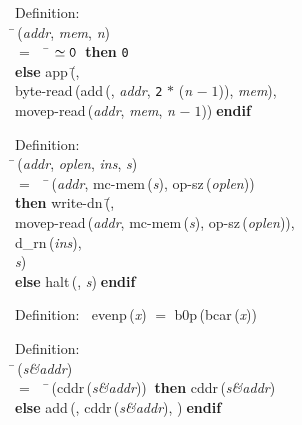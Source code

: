 \begin{tabbing}{\sc Definition}: \\  
\=\,({\it{addr\/}}, {\it{mem\/}}, {\it{n\/}}) \\ 
$=$$\;\;\;\;$\= $\simeq {\tt{0}}$$\;\;${\bf then }{\tt{0}} \\ 
{\bf else }{\rm{app}}\,(\=, \\ 
{\rm{byte-read}}\,({\rm{add}}\,({}, {\it{addr\/}}, {\tt{2}} $*$ ({\it{n\/}} $-\;1$)), {\it{mem\/}}), \\ 
{\rm{movep-read}}\,({\it{addr\/}}, {\it{mem\/}}, {\it{n\/}} $-\;1$))\-$\;${\bf  endif}\-\-
\end{tabbing}

\begin{tabbing}{\sc Definition}: \\  
\=\,({\it{addr\/}}, {\it{oplen\/}}, {\it{ins\/}}, {\it{s\/}}) \\ 
$=$$\;\;\;\;$\=\,({\it{addr\/}}, {\rm{mc-mem}}\,({\it{s\/}}), {\rm{op-sz}}\,({\it{oplen\/}})) \\ 
{\bf then }{\rm{write-dn}}\,(\=, \\ 
{\rm{movep-read}}\,({\it{addr\/}}, {\rm{mc-mem}}\,({\it{s\/}}), {\rm{op-sz}}\,({\it{oplen\/}})), \\ 
{\rm{d\_rn}}\,({\it{ins\/}}), \\ 
{\it{s\/}})\- \\ 
{\bf else }{\rm{halt}}\,({}, {\it{s\/}})$\;${\bf  endif}\-\-
\end{tabbing}

\begin{tabbing}{\sc Definition}:$\;\;$
{\rm{evenp}}\,({\it{x\/}}) $=$ {\rm{b0p}}\,({\rm{bcar}}\,({\it{x\/}}))
\end{tabbing}

\begin{tabbing}{\sc Definition}: \\  
\=\,({\it{s\&addr\/}}) \\ 
$=$$\;\;\;\;$\=\,({\rm{cddr}}\,({\it{s\&addr\/}}))$\;\;${\bf then }{\rm{cddr}}\,({\it{s\&addr\/}}) \\ 
{\bf else }{\rm{add}}\,({}, {\rm{cddr}}\,({\it{s\&addr\/}}), {})$\;${\bf  endif}\-\-
\end{tabbing}


